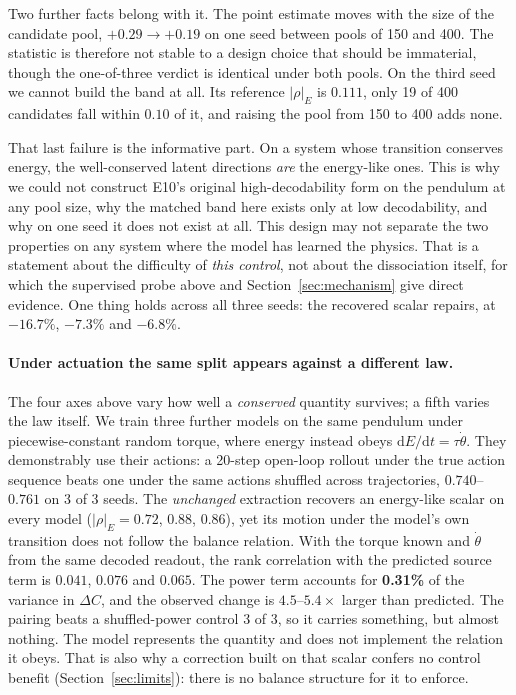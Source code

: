 Two further facts belong with it. The point estimate moves with the size of the candidate pool,
$+0.29 \to +0.19$ on one seed between pools of 150 and 400. The statistic is therefore not stable to
a design choice that should be immaterial, though the one-of-three verdict is identical under both
pools. On the third seed we cannot build the band at all. Its reference $|\rho|_E$ is $0.111$, only
19 of 400 candidates fall within $0.10$ of it, and raising the pool from 150 to 400 adds none.

That last failure is the informative part. On a system whose transition conserves energy, the
well-conserved latent directions \emph{are} the energy-like ones. This is why we could not construct
E10's original high-decodability form on the pendulum at any pool size, why the matched band here
exists only at low decodability, and why on one seed it does not exist at all. This design may not
separate the two properties on any system where the model has learned the physics. That is a
statement about the difficulty of \emph{this control}, not about the dissociation itself, for which
the supervised probe above and Section~\ref{sec:mechanism} give direct evidence. One thing holds
across all three seeds: the recovered scalar repairs, at $-16.7\%$, $-7.3\%$ and $-6.8\%$.


\paragraph{Under actuation the same split appears against a different law.}
The four axes above vary how well a \emph{conserved} quantity survives; a fifth varies the law
itself. We train three further models on the same pendulum under piecewise-constant random torque,
where energy instead obeys $\mathrm{d}E/\mathrm{d}t = \tau\dot\theta$. They demonstrably use their
actions: a 20-step open-loop rollout under the true action sequence beats one under the same actions
shuffled across trajectories, $0.740$--$0.761$ on 3 of 3 seeds. The \emph{unchanged} extraction
recovers an energy-like scalar on every model ($|\rho|_E = 0.72$, $0.88$, $0.86$), yet its motion
under the model's own transition does not follow the balance relation. With the torque known and
$\dot\theta$ from the same decoded readout, the rank correlation with the predicted source term is
$0.041$, $0.076$ and $0.065$. The power term accounts for \textbf{0.31\%} of the variance in
$\Delta C$, and the observed change is $4.5$--$5.4\times$ larger than predicted. The pairing beats a
shuffled-power control 3 of 3, so it carries something, but almost nothing. The model represents the
quantity and does not implement the relation it obeys. That is also why a correction built on that
scalar confers no control benefit (Section~\ref{sec:limits}): there is no balance structure for it to
enforce.


